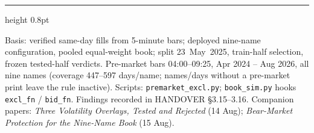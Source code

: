 \documentclass[11pt,a4paper]{article}
\begin{document}
\vspace{0.4cm}
{\color{bcnavy}\hrule height 0.8pt}
\vspace{0.2cm}
{\footnotesize\color{bcgrey} Basis: verified same-day fills from 5-minute
bars; deployed nine-name configuration, pooled equal-weight book; split
23~May~2025, train-half selection, frozen tested-half verdicts. Pre-market
bars 04:00--09:25, Apr 2024 -- Aug 2026, all nine names (coverage 447--597
days/name; names/days without a pre-market print leave the rule inactive).
Scripts: \texttt{premarket\_excl.py}; \texttt{book\_sim.py} hooks
\texttt{excl\_fn} / \texttt{bid\_fn}. Findings recorded in HANDOVER
\S3.15--3.16. Companion papers: \emph{Three Volatility Overlays, Tested and
Rejected} (14 Aug); \emph{Bear-Market Protection for the Nine-Name Book}
(15 Aug).}
\end{document}
